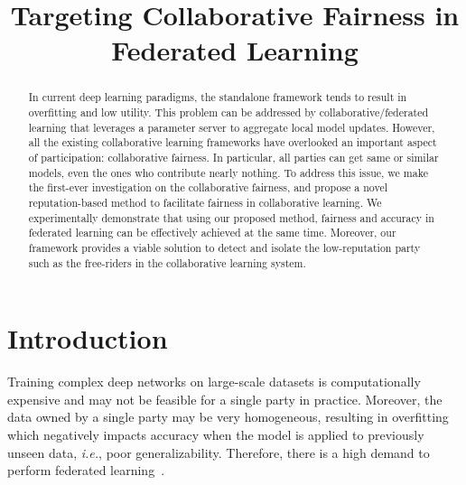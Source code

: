 \documentclass{article}
\title{Targeting Collaborative Fairness in Federated Learning}%
\newcommand{\ie}{\textit{i.e.},\xspace}
\begin{document}
\maketitle

\begin{abstract}
In current deep learning paradigms, the standalone framework tends to result in overfitting and low utility. This problem can be addressed by %
collaborative/federated learning that leverages a parameter server to aggregate local model updates. However, all the existing collaborative learning frameworks have overlooked an important aspect of participation: collaborative fairness. In particular, all parties can get same or similar models, even the ones who contribute nearly nothing. To address this issue, we make the first-ever investigation on the collaborative fairness, and propose a novel reputation-based method to facilitate fairness in collaborative learning. %
We experimentally demonstrate that using our proposed method, fairness and accuracy in federated learning can be effectively achieved at the same time. Moreover, our framework provides a viable solution to detect and isolate the low-reputation party such as the free-riders in the collaborative learning system.
\end{abstract}


\section{Introduction}
Training complex deep networks on large-scale datasets is computationally expensive and may not be feasible for a single party in practice. Moreover, the data owned by a single party may be very homogeneous, resulting in overfitting which negatively impacts accuracy when the model is applied to previously unseen data, \ie poor generalizability. Therefore, there is a high demand to perform federated learning~\cite{FL2019}. 
\end{document}
